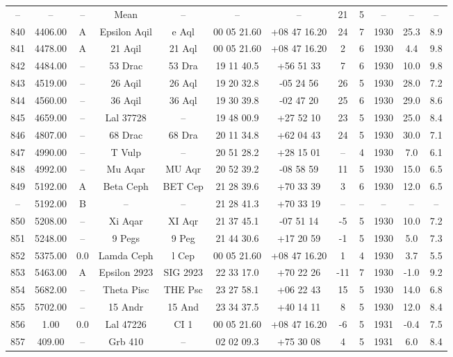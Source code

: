 \begin{table}
\begin{tabular}{cccccccccccc}
-- & -- & -- & Mean & -- & -- & -- & 21 & 5 & -- & -- & -- \\
840 & 4406.00 & A & Epsilon Aqil & e Aql & 00 05 21.60 & +08 47 16.20 & 24 & 7 & 1930 & 25.3 & 8.9 \\
841 & 4478.00 & A & 21 Aqil & 21 Aql & 00 05 21.60 & +08 47 16.20 & 2 & 6 & 1930 & 4.4 & 9.8 \\
842 & 4484.00 & -- & 53 Drac & 53 Dra & 19 11 40.5 & +56 51 33 & 7 & 6 & 1930 & 10.0 & 9.8 \\
843 & 4519.00 & -- & 26 Aqil & 26 Aql & 19 20 32.8 & -05 24 56 & 26 & 5 & 1930 & 28.0 & 7.2 \\
844 & 4560.00 & -- & 36 Aqil & 36 Aql & 19 30 39.8 & -02 47 20 & 25 & 6 & 1930 & 29.0 & 8.6 \\
845 & 4659.00 & -- & Lal 37728 & -- & 19 48 00.9 & +27 52 10 & 23 & 5 & 1930 & 25.0 & 8.4 \\
846 & 4807.00 & -- & 68 Drac & 68 Dra & 20 11 34.8 & +62 04 43 & 24 & 5 & 1930 & 30.0 & 7.1 \\
847 & 4990.00 & -- & T Vulp & -- & 20 51 28.2 & +28 15 01 & -- & 4 & 1930 & 7.0 & 6.1 \\
848 & 4992.00 & -- & Mu Aqar & MU Aqr & 20 52 39.2 & -08 58 59 & 11 & 5 & 1930 & 15.0 & 6.5 \\
849 & 5192.00 & A & Beta Ceph & BET Cep & 21 28 39.6 & +70 33 39 & 3 & 6 & 1930 & 12.0 & 6.5 \\
-- & 5192.00 & B & -- & -- & 21 28 41.3 & +70 33 19 & -- & -- & -- & -- & -- \\
850 & 5208.00 & -- & Xi Aqar & XI Aqr & 21 37 45.1 & -07 51 14 & -5 & 5 & 1930 & 10.0 & 7.2 \\
851 & 5248.00 & -- & 9 Pegs & 9 Peg & 21 44 30.6 & +17 20 59 & -1 & 5 & 1930 & 5.0 & 7.3 \\
852 & 5375.00 & 0.0 & Lamda Ceph & l Cep & 00 05 21.60 & +08 47 16.20 & 1 & 4 & 1930 & 3.7 & 5.5 \\
853 & 5463.00 & A & Epsilon 2923 & SIG 2923 & 22 33 17.0 & +70 22 26 & -11 & 7 & 1930 & -1.0 & 9.2 \\
854 & 5682.00 & -- & Theta Pisc & THE Psc & 23 27 58.1 & +06 22 43 & 15 & 5 & 1930 & 14.0 & 6.8 \\
855 & 5702.00 & -- & 15 Andr & 15 And & 23 34 37.5 & +40 14 11 & 8 & 5 & 1930 & 12.0 & 8.4 \\
856 & 1.00 & 0.0 & Lal 47226 & CI 1 & 00 05 21.60 & +08 47 16.20 & -6 & 5 & 1931 & -0.4 & 7.5 \\
857 & 409.00 & -- & Grb 410 & -- & 02 02 09.3 & +75 30 08 & 4 & 5 & 1931 & 6.0 & 8.4 \\

\end{tabular}
\end{table}
